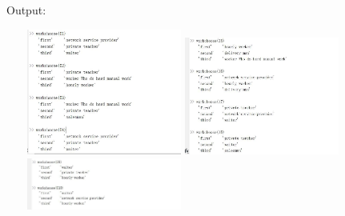 \documentclass[12pt]{article}
\begin{document}
\begin{appendix}
        ~~Output:%
        \begin{figure}[!htbp]
            \centering
            {
            \begin{minipage}[t]{0.3\linewidth}
            \centering
            \includegraphics[width=2in]{figure/pc1.jpg}
            \end{minipage}%
            }%
            {
            \begin{minipage}[t]{0.3\linewidth}
            \centering
            \includegraphics[width=2in]{figure/pc2.jpg}
            \end{minipage}%
            }
            {
            \begin{minipage}[t]{0.3\linewidth}
            \centering
            \includegraphics[width=2in]{figure/pc3.jpg}
            \end{minipage}%
            }
        \end{figure}
\end{appendix}
\end{document}
